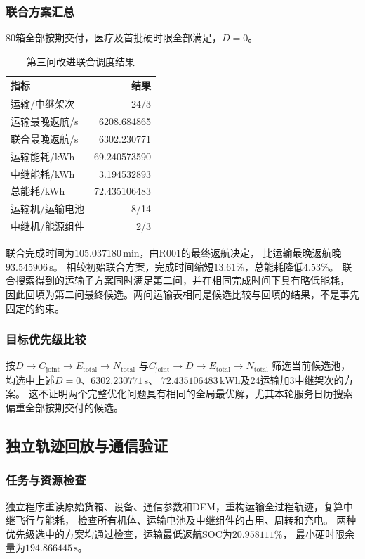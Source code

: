 \documentclass[bwprint]{gmcmthesis}
\begin{document}
\subsubsection{联合方案汇总}
80箱全部按期交付，医疗及首批硬时限全部满足，$D=0$。
\begin{table}[htbp]
\centering
\small
\caption{第三问改进联合调度结果}
\label{tab:q3_summary}
\begin{tabular}{lr}
\toprule
指标 & 结果 \\
\midrule
运输/中继架次 & 24/3 \\
运输最晚返航/s & 6208.684865 \\
联合最晚返航/s & 6302.230771 \\
运输能耗/kWh & 69.240573590 \\
中继能耗/kWh & 3.194532893 \\
总能耗/kWh & 72.435106483 \\
运输机/运输电池 & 8/14 \\
中继机/能源组件 & 2/3 \\
\bottomrule
\end{tabular}
\end{table}

联合完成时间为$105.037180\,\mathrm{min}$，由R001的最终返航决定，
比运输最晚返航晚$93.545906\,\mathrm{s}$。
相较初始联合方案，完成时间缩短$13.61\%$，总能耗降低$4.53\%$。
联合搜索得到的运输子方案同时满足第二问，并在相同完成时间下具有略低能耗，
因此回填为第二问最终候选。两问运输表相同是候选比较与回填的结果，不是事先固定的约束。

\subsubsection{目标优先级比较}
按$D\rightarrow C_{\mathrm{joint}}\rightarrow E_{\mathrm{total}}\rightarrow N_{\mathrm{total}}$
与$C_{\mathrm{joint}}\rightarrow D\rightarrow E_{\mathrm{total}}\rightarrow N_{\mathrm{total}}$
筛选当前候选池，均选中上述$D=0$、$6302.230771\,\mathrm{s}$、
$72.435106483\,\mathrm{kWh}$及24运输加3中继架次的方案。
这不证明两个完整优化问题具有相同的全局最优解，尤其本轮服务日历搜索偏重全部按期交付的候选。

\subsection{独立轨迹回放与通信验证}
\subsubsection{任务与资源检查}
独立程序重读原始货箱、设备、通信参数和DEM，重构运输全过程轨迹，复算中继飞行与能耗，
检查所有机体、运输电池及中继组件的占用、周转和充电。
两种优先级选中的方案均通过检查，运输最低返航SOC为$20.958111\%$，
最小硬时限余量为$194.866445\,\mathrm{s}$。
\end{document}
